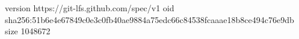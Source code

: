 version https://git-lfs.github.com/spec/v1
oid sha256:51b6e4e67849c0e3c0fb40ae9884a75edc66c84538fcaaae18b8ce494c76e9db
size 1048672
